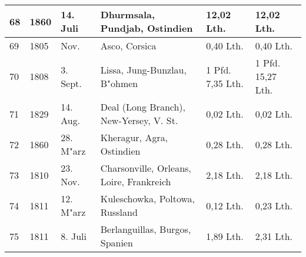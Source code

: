 \documentclass[a4paper, 11pt, oneside]{article}
\begin{document}
\begin{center}
\begin{footnotesize}
\begin{tabular}{ |p{7mm}|p{7mm}|p{13mm}|p{48mm}|p{22mm}|p{22mm}| }
    68 & 1860 & 14. Juli & Dhurmsala, Pundjab, Ostindien & 12,02 Lth. & 12,02 Lth.\\\hline
    69 & 1805 & Nov. & Asco, Corsica & 0,40 Lth. & 0,40 Lth.\\\hline
    70 & 1808 & 3. Sept. & Lissa, Jung-Bunzlau, B"ohmen & 1 Pfd. 7,35 Lth. & 1 Pfd. 15,27 Lth.\\\hline
    71 & 1829 & 14. Aug. & Deal (Long Branch), New-Yersey, V. St. & 0,02 Lth. & 0,02 Lth.\\\hline
    72 & 1860 & 28. M"arz & Kheragur, Agra, Ostindien & 0,28 Lth. & 0,28 Lth.\\\hline
    73 & 1810 & 23. Nov. & Charsonville, Orleans, Loire, Frankreich & 2,18 Lth. & 2,18 Lth.\\\hline
    74 & 1811 & 12. M"arz & Kuleschowka, Poltowa, Russland & 0,12 Lth. & 0,23 Lth.\\\hline
    75 & 1811 & 8. Juli & Berlanguillas, Burgos, Spanien & 1,89 Lth. & 2,31 Lth.\\
    \hline
\end{tabular}
\end{footnotesize}
\end{center}
\end{document}
